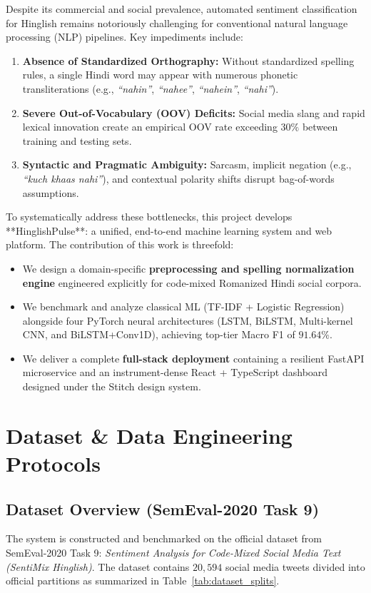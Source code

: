 \documentclass[11pt,a4paper]{article}
\begin{document}
Despite its commercial and social prevalence, automated sentiment classification for Hinglish remains notoriously challenging for conventional natural language processing (NLP) pipelines. Key impediments include:
\begin{enumerate}
    \item \textbf{Absence of Standardized Orthography:} Without standardized spelling rules, a single Hindi word may appear with numerous phonetic transliterations (e.g., \textit{``nahin''}, \textit{``nahee''}, \textit{``nahein''}, \textit{``nahi''}).
    \item \textbf{Severe Out-of-Vocabulary (OOV) Deficits:} Social media slang and rapid lexical innovation create an empirical OOV rate exceeding $30\%$ between training and testing sets.
    \item \textbf{Syntactic and Pragmatic Ambiguity:} Sarcasm, implicit negation (e.g., \textit{``kuch khaas nahi''}), and contextual polarity shifts disrupt bag-of-words assumptions.
\end{enumerate}

To systematically address these bottlenecks, this project develops **HinglishPulse**: a unified, end-to-end machine learning system and web platform. The contribution of this work is threefold:
\begin{itemize}
    \item We design a domain-specific \textbf{preprocessing and spelling normalization engine} engineered explicitly for code-mixed Romanized Hindi social corpora.
    \item We benchmark and analyze classical ML (TF-IDF + Logistic Regression) alongside four PyTorch neural architectures (LSTM, BiLSTM, Multi-kernel CNN, and BiLSTM+Conv1D), achieving top-tier Macro F1 of $91.64\%$.
    \item We deliver a complete \textbf{full-stack deployment} containing a resilient FastAPI microservice and an instrument-dense React + TypeScript dashboard designed under the Stitch design system.
\end{itemize}

\section{Dataset \& Data Engineering Protocols}

\subsection{Dataset Overview (SemEval-2020 Task 9)}
The system is constructed and benchmarked on the official dataset from SemEval-2020 Task 9: \textit{Sentiment Analysis for Code-Mixed Social Media Text (SentiMix Hinglish)}. The dataset contains $20,594$ social media tweets divided into official partitions as summarized in Table~\ref{tab:dataset_splits}.
\end{document}
